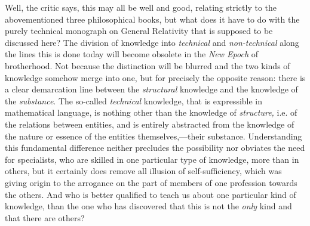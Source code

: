 \documentclass[12pt]{book}
\begin{document}
Well, the critic says, this may all be well and good, relating strictly to the abovementioned three philosophical books,
but what does it have to do with the purely technical monograph on General Relativity that is supposed to be discussed here?
The division of knowledge into \emph{technical} and \emph{non\hyp{}technical} along the lines this is done today will become obsolete
in the \emph{New Epoch} of brotherhood.
Not because the distinction will be blurred and the two kinds of knowledge somehow merge into one, but for precisely the opposite reason:
there is a clear demarcation line between the \emph{structural} knowledge and the knowledge of the \emph{substance}.
The so\hyp{}called \emph{technical} knowledge, that is expressible in mathematical language, is nothing other than the knowledge
of \emph{structure,} i.e. of the relations between entities, and is entirely abstracted from the knowledge of the nature or essence of
the entities themselves,---their substance.
Understanding this fundamental difference neither precludes the possibility nor obviates the need for specialists, who
are skilled in one particular type of knowledge, more than in others, but it certainly does remove all illusion of
self\hyp{}sufficiency, which was giving origin to the arrogance on the part of members of one profession towards the others.
And who is better qualified to teach us about one particular kind of knowledge, than the one who has discovered that this
is not the \emph{only} kind and that there are others?
\end{document}
